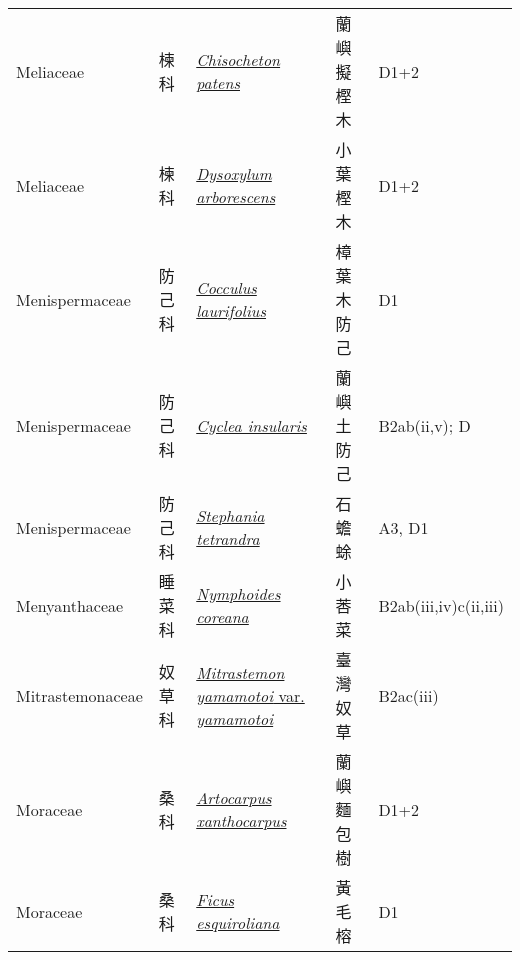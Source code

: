 {\begin{longtable}{L{2.5cm}L{2cm}L{5cm}L{2.5cm}L{3cm}}
    Meliaceae & 楝科 & \href{http://www.theplantlist.org/tpl1.1/search?q=Chisocheton+patens}{\textit{Chisocheton patens} } & 蘭嶼擬樫木 & D1+2    \\
    Meliaceae & 楝科 & \href{http://www.theplantlist.org/tpl1.1/search?q=Dysoxylum+arborescens}{\textit{Dysoxylum arborescens} } & 小葉樫木 & D1+2    \\
    Menispermaceae & 防己科 & \href{http://www.theplantlist.org/tpl1.1/search?q=Cocculus+laurifolius}{\textit{Cocculus laurifolius} } & 樟葉木防己 & D1    \\
    Menispermaceae & 防己科 & \href{http://www.theplantlist.org/tpl1.1/search?q=Cyclea+insularis}{\textit{Cyclea insularis} } & 蘭嶼土防己 & B2ab(ii,v); D    \\
    Menispermaceae & 防己科 & \href{http://www.theplantlist.org/tpl1.1/search?q=Stephania+tetrandra}{\textit{Stephania tetrandra} } & 石蟾蜍 & A3, D1    \\
    Menyanthaceae & 睡菜科 & \href{http://www.theplantlist.org/tpl1.1/search?q=Nymphoides+coreana}{\textit{Nymphoides coreana} } & 小莕菜 & B2ab(iii,iv)c(ii,iii)    \\
    Mitrastemonaceae & 奴草科 & \href{http://www.theplantlist.org/tpl1.1/search?q=Mitrastemon+yamamotoi+var.+yamamotoi}{\textit{Mitrastemon yamamotoi} var. \textit{yamamotoi} } & 臺灣奴草 & B2ac(iii)    \\
    Moraceae & 桑科 & \href{http://www.theplantlist.org/tpl1.1/search?q=Artocarpus+xanthocarpus}{\textit{Artocarpus xanthocarpus} } & 蘭嶼麵包樹 & D1+2    \\
    Moraceae & 桑科 & \href{http://www.theplantlist.org/tpl1.1/search?q=Ficus+esquiroliana}{\textit{Ficus esquiroliana} } & 黃毛榕 & D1    \\

\end{longtable}}
